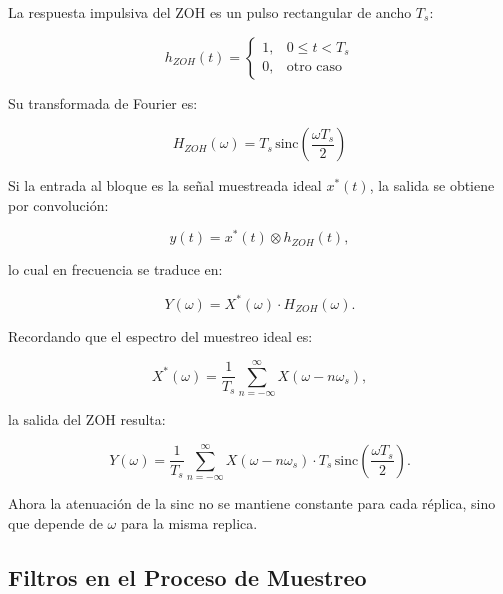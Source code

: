 \bigskip

La respuesta impulsiva del ZOH es un pulso rectangular de ancho $T_s$:

\begin{equation}
    h_{ZOH}(t) = 
    \begin{cases}
        1, & 0 \leq t < T_s \\
        0, & \text{otro caso}
    \end{cases}
\end{equation}

Su transformada de Fourier es:

\begin{equation}
    H_{ZOH}(\omega) = T_s \, \text{sinc}\!\left(\frac{\omega T_s}{2}\right)
\end{equation}

\bigskip

Si la entrada al bloque es la señal muestreada ideal $x^*(t)$, la salida se obtiene por convolución:

\begin{equation}
    y(t) = x^*(t) \otimes h_{ZOH}(t),
\end{equation}

lo cual en frecuencia se traduce en:

\begin{equation}
    Y(\omega) = X^*(\omega) \cdot H_{ZOH}(\omega).
\end{equation}

Recordando que el espectro del muestreo ideal es:

\begin{equation}
    X^*(\omega) = \frac{1}{T_s} \sum_{n=-\infty}^{\infty} X(\omega - n\omega_s),
\end{equation}

la salida del ZOH resulta:

\begin{equation}
    Y(\omega) = \frac{1}{T_s} \sum_{n=-\infty}^{\infty} 
    X(\omega - n\omega_s) \cdot T_s \, \text{sinc}\!\left(\frac{\omega T_s}{2}\right).
\end{equation}

Ahora la atenuación de la sinc no se mantiene constante para cada réplica, 
sino que depende de $\omega$ para la misma replica.

\subsection{Filtros en el Proceso de Muestreo}

